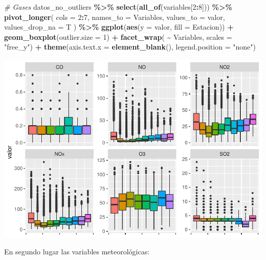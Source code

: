 \documentclass[notspecified,article,submit,moreauthors,pdftex]{Definitions/mdpi}
\newenvironment{Shaded}{\begin{snugshade}}{\end{snugshade}}
\newcommand{\AttributeTok}[1]{\textcolor[rgb]{0.13,0.29,0.53}{#1}}
\newcommand{\CommentTok}[1]{\textcolor[rgb]{0.56,0.35,0.01}{\textit{#1}}}
\newcommand{\DecValTok}[1]{\textcolor[rgb]{0.00,0.00,0.81}{#1}}
\newcommand{\FunctionTok}[1]{\textcolor[rgb]{0.13,0.29,0.53}{\textbf{#1}}}
\newcommand{\NormalTok}[1]{#1}
\newcommand{\SpecialCharTok}[1]{\textcolor[rgb]{0.81,0.36,0.00}{\textbf{#1}}}
\newcommand{\StringTok}[1]{\textcolor[rgb]{0.31,0.60,0.02}{#1}}
\begin{document}
\begin{Shaded}
\begin{Highlighting}[]
\CommentTok{\# Gases}
\NormalTok{datos\_no\_outliers }\SpecialCharTok{\%\textgreater{}\%}
  \FunctionTok{select}\NormalTok{(}\FunctionTok{all\_of}\NormalTok{(variables[}\DecValTok{2}\SpecialCharTok{:}\DecValTok{8}\NormalTok{])) }\SpecialCharTok{\%\textgreater{}\%}
  \FunctionTok{pivot\_longer}\NormalTok{(}
    \AttributeTok{cols =} \DecValTok{2}\SpecialCharTok{:}\DecValTok{7}\NormalTok{,}
    \AttributeTok{names\_to =} \StringTok{\textquotesingle{}Variables\textquotesingle{}}\NormalTok{,}
    \AttributeTok{values\_to =} \StringTok{\textquotesingle{}valor\textquotesingle{}}\NormalTok{,}
    \AttributeTok{values\_drop\_na =}\NormalTok{ T}
\NormalTok{  ) }\SpecialCharTok{\%\textgreater{}\%}
  \FunctionTok{ggplot}\NormalTok{(}\FunctionTok{aes}\NormalTok{(}\AttributeTok{y =}\NormalTok{ valor, }\AttributeTok{fill =}\NormalTok{ Estacion)) }\SpecialCharTok{+}
  \FunctionTok{geom\_boxplot}\NormalTok{(}\AttributeTok{outlier.size =} \DecValTok{1}\NormalTok{) }\SpecialCharTok{+}
  \FunctionTok{facet\_wrap}\NormalTok{( }\SpecialCharTok{\textasciitilde{}}\NormalTok{ Variables, }\AttributeTok{scales =} \StringTok{"free\_y"}\NormalTok{) }\SpecialCharTok{+}
  \FunctionTok{theme}\NormalTok{(}\AttributeTok{axis.text.x =} \FunctionTok{element\_blank}\NormalTok{(), }\AttributeTok{legend.position =} \StringTok{"none"}\NormalTok{)}
\end{Highlighting}
\end{Shaded}

\includegraphics{Memoria_files/figure-latex/unnamed-chunk-19-1.pdf}

En segundo lugar las variables meteorológicas:
\end{document}
